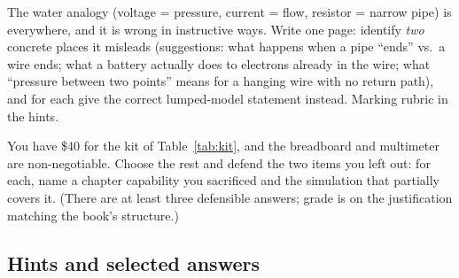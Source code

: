 \begin{exercise}
\label{ex:water}
The water analogy (voltage = pressure, current = flow, resistor = narrow
pipe) is everywhere, and it is wrong in instructive ways. Write one page:
identify \emph{two} concrete places it misleads (suggestions: what happens
when a pipe ``ends'' vs.\ a wire ends; what a battery actually does to
electrons already in the wire; what ``pressure between two points'' means for
a hanging wire with no return path), and for each give the correct lumped-model
statement instead. Marking rubric in the hints.
\end{exercise}

\begin{exercise}
\label{ex:kitdesign}
You have \$40 for the kit of Table~\ref{tab:kit}, and the breadboard and
multimeter are non-negotiable. Choose the rest and defend the two items you
left out: for each, name a chapter capability you sacrificed and the
simulation that partially covers it. (There are at least three defensible
answers; grade is on the justification matching the book's structure.)
\end{exercise}

\subsection*{Hints and selected answers}

